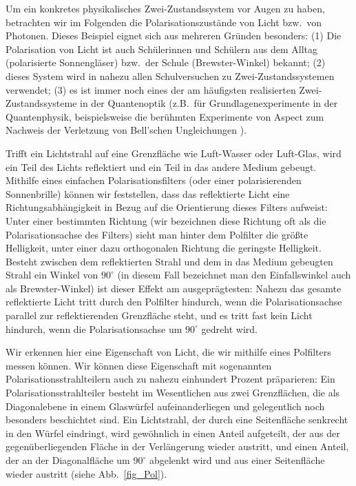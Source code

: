 Um ein konkretes physikalisches Zwei-Zustandssystem vor Augen zu haben, betrachten
wir im Folgenden die Polarisationszust\"ande von Licht bzw.\ von Photonen. Dieses Beispiel
eignet sich aus mehreren Gr\"unden besonders: (1) Die Polarisation von Licht ist auch Sch\"ulerinnen
und Sch\"ulern aus dem Alltag (polarisierte Sonnengl\"aser) bzw.\ der Schule (Brewster-Winkel) bekannt;
(2) dieses System wird in nahezu allen Schulversuchen zu Zwei-Zustandssystemen verwendet;
(3) es ist immer noch eines der am h\"aufigsten realisierten Zwei-Zustandssysteme in der
Quantenoptik (z.B.\ f\"ur Grundlagenexperimente in der Quantenphysik, beispielsweise die
ber\"uhmten Experimente von Aspect zum Nachweis der Verletzung von Bell'schen Ungleichungen \cite{Aspect}). 

Trifft ein Lichtstrahl auf eine Grenzfl\"ache wie Luft-Wasser oder Luft-Glas,
wird ein Teil des Lichts reflektiert und ein Teil in das andere Medium gebeugt. Mithilfe eines
einfachen Polarisationsfilters (oder einer polarisierenden Sonnenbrille) k\"onnen wir feststellen, dass
das reflektierte Licht eine Richtungsabh\"angigkeit in Bezug auf die Orientierung dieses
Filters aufweist: Unter einer bestimmten Richtung (wir bezeichnen diese Richtung oft als
die Polarisationsachse des Filters) sieht man hinter dem Polfilter die gr\"o\ss te Helligkeit,
unter einer dazu orthogonalen Richtung die geringste Helligkeit. Besteht zwischen dem
reflektierten Strahl und dem in das Medium gebeugten Strahl ein Winkel von $90^\circ$
(in diesem Fall bezeichnet man den Einfallswinkel auch als Brewster-Winkel) ist dieser
Effekt am ausgepr\"agtesten: Nahezu das gesamte reflektierte Licht tritt durch den Polfilter
hindurch, wenn die Polarisationsachse parallel zur reflektierenden Grenzfl\"ache steht, und
es tritt fast kein Licht hindurch, wenn die Polarisationsachse um $90^\circ$ gedreht wird.  

Wir erkennen hier eine Eigenschaft von Licht, die wir mithilfe eines Polfilters messen
k\"onnen. Wir k\"onnen diese Eigenschaft mit sogenannten Polarisationsstrahlteilern
auch zu nahezu einhundert Prozent pr\"aparieren: Ein Polarisationsstrahlteiler besteht im
Wesentlichen aus zwei Grenzfl\"achen, die als Diagonalebene in einem Glasw\"urfel
aufeinanderliegen und gelegentlich noch besonders beschichtet sind. Ein Lichtstrahl,
der durch eine Seitenfl\"ache senkrecht in den W\"urfel eindringt, wird gew\"ohnlich in einen
Anteil aufgeteilt, der aus der gegen\"uberliegenden Fl\"ache in der Verl\"angerung wieder austritt,
und einen Anteil, der an der Diagonalfl\"ache um $90^\circ$ abgelenkt wird und aus einer
Seitenfl\"ache wieder austritt (siehe Abb.\ \ref{fig_Pol}). 

